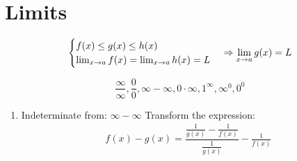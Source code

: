 \chapter{Limits}
    \begin{equation}
        \begin{cases}
            f(x) \leq g(x) \leq h(x) \\
            \lim_{x \to a} f(x) = \lim_{x \to a} h(x) = L
        \end{cases}
        \Rightarrow \lim_{x \to a} g(x) = L
    \end{equation}

    \begin{equation}
        \dfrac{\infty}{\infty}, \dfrac{0}{0}, \infty - \infty, 0 \cdot \infty,
        1^{\infty}, \infty^{0}, 0^{0}
    \end{equation}

    \begin{enumerate}
        \item Indeterminate from: $\infty - \infty$
            Transform the expression: \\
            \begin{align*}
                f(x) - g(x) = \dfrac{\frac{1}{g(x)} - \frac{1}{f(x)}}{\frac{1}{g(x)}} - \frac{1}{f(x)}
            \end{align*}
    \end{enumerate}
